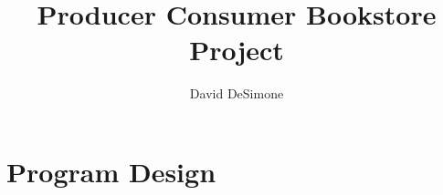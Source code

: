 \documentclass[]{article}
\title{Producer Consumer Bookstore Project}
\author{David DeSimone}
\begin{document}
\maketitle

\section{Program Design}
\end{document}
